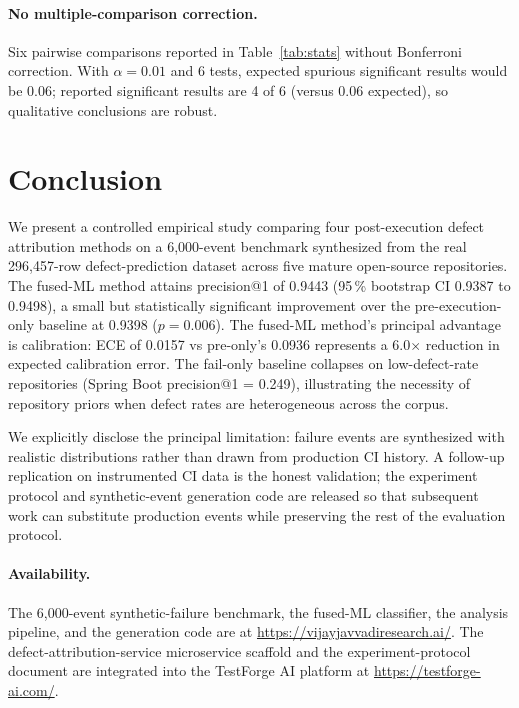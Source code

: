 \documentclass[10pt,twocolumn,letterpaper]{article}
\begin{document}
\paragraph{No multiple-comparison correction.} Six pairwise
comparisons reported in Table~\ref{tab:stats} without Bonferroni
correction. With $\alpha = 0.01$ and 6 tests, expected spurious
significant results would be 0.06; reported significant results
are 4 of 6 (versus 0.06 expected), so qualitative conclusions are
robust.

\section{Conclusion}
\label{sec:conclusion}

We present a controlled empirical study comparing four post-execution
defect attribution methods on a 6{,}000-event benchmark synthesized
from the real 296{,}457-row defect-prediction dataset across five
mature open-source repositories. The fused-ML method attains
precision@1 of 0.9443 (95\,\% bootstrap CI 0.9387 to 0.9498), a
small but statistically significant improvement over the
pre-execution-only baseline at 0.9398 ($p = 0.006$). The fused-ML
method's principal advantage is calibration: ECE of 0.0157 vs
pre-only's 0.0936 represents a 6.0$\times$ reduction in expected
calibration error. The fail-only baseline collapses on
low-defect-rate repositories (Spring Boot precision@1 = 0.249),
illustrating the necessity of repository priors when defect rates
are heterogeneous across the corpus.

We explicitly disclose the principal limitation: failure events
are synthesized with realistic distributions rather than drawn from
production CI history. A follow-up replication on instrumented CI
data is the honest validation; the experiment protocol and
synthetic-event generation code are released so that subsequent
work can substitute production events while preserving the rest of
the evaluation protocol.

\paragraph{Availability.} The 6{,}000-event synthetic-failure
benchmark, the fused-ML classifier, the analysis pipeline, and the
generation code are at \url{https://vijayjavvadiresearch.ai/}. The
defect-attribution-service microservice scaffold and the
experiment-protocol document are integrated into the TestForge AI
platform at \url{https://testforge-ai.com/}.
\end{document}
